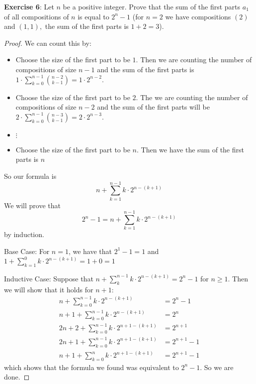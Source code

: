 \documentclass{article}
\begin{document}
\textbf{Exercise 6}: Let $n$ be a positive integer. Prove that the sum of the first parts $a_{1}$ of all compositions of $n$ is equal to $2^{n} - 1$ (for $n = 2$ we have compositions $(2)$ and $(1, 1),$ the sum of the first parts is $1 + 2 = 3$).
    \begin{proof}
        We can count this by:
            \begin{itemize}
                \item Choose the size of the first part to be $1$. Then we are counting the number of compositions of size $n - 1$ and the sum of the first parts is $1 \cdot \sum_{k = 0}^{n - 1} \binom{n - 2}{k - 1} = 1 \cdot 2^{n - 2}$.

                \item Choose the size of the first part to be $2$. The we are counting the number of compositions of size $n - 2$ and the sum of the first parts will be $2 \cdot \sum_{k = 0}^{n - 1} \binom{n - 3}{k - 1} = 2 \cdot 2^{n - 3}$.

                \item $\vdots $

                \item Choose the size of the first part to be $n$. Then we have the sum of the first parts is $n$ 
            \end{itemize}
        So our formula is 
            \begin{equation*}
                n + \sum_{k = 1}^{n - 1} k \cdot 2^{n - (k + 1)} 
            \end{equation*}
        We will prove that
            \begin{equation*}
                2^{n} - 1 = n + \sum_{k = 1}^{n - 1} k \cdot 2^{n - (k + 1)} 
            \end{equation*}
        by induction.

        Base Case: For $n = 1$, we have that $2^{1} - 1 = 1$ and $1 + \sum_{k = 1}^{0} k \cdot 2^{n - (k + 1)} = 1 + 0 = 1$

        Inductive Case: Suppose that $n + \sum_{k}^{n - 1} k \cdot 2^{n - (k + 1)} = 2^{n} - 1$ for $n \geq 1$. Then we will show that it holds for $n + 1$:
            \begin{align*}
                n + \sum_{k = 0}^{n - 1} k \cdot 2^{n - (k + 1)}          &= 2^{n} - 1     \\
                n + 1  + \sum_{k = 0}^{n - 1} k \cdot 2^{n - (k + 1)}     &= 2^{n}         \\
                2n + 2 + \sum_{k = 0}^{n - 1} k \cdot 2^{n + 1 - (k + 1)} &= 2^{n + 1}     \\
                2n + 1 + \sum_{k = 0}^{n - 1} k \cdot 2^{n + 1 - (k + 1)} &= 2^{n + 1} - 1 \\
                n + 1 + \sum_{k = 0}^{n} k \cdot 2^{n + 1 - (k + 1)}      &= 2^{n + 1} - 1   
            \end{align*}
        which shows that the formula we found was equivalent to $2^{n} - 1$. So we are done.
    \end{proof}
\end{document}
